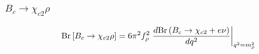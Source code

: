 \documentclass{beamer}
\begin{document}
\begin{frame}
  \frametitle{$B_c \to \chi_{c2} \rho$}
  $$
  \mathrm{Br}\left[B_c \to \chi_{c2} \rho\right] =
  6\pi^2 f_\rho^2 \left.
    \frac{d\mathrm{Br}\left(B_c\to\chi_{c2}+e\nu\right)}{dq^2}
  \right|_{q^2=m_\rho^2}
  $$
  \begin{columns}
    \begin{column}{0.5\textwidth}
      \vspace{3mm}
      
    \end{column}
  \begin{column}{0.5\textwidth}
      \\
      \vspace{3mm}
      
    \end{column}
\end{columns}
\end{frame}
\end{document}
